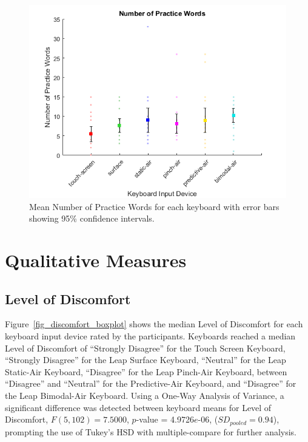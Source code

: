 \begin{figure}[h]
	\centering
	\includegraphics{fig_num_practice_mean}
	\caption[Mean Number of Practice Words]{Mean Number of Practice Words for each keyboard with error bars showing 95\% confidence intervals.}
	\label{fig_num_practice_mean}
\end{figure}

\section{Qualitative Measures}

\subsection{Level of Discomfort}
Figure~\ref{fig_discomfort_boxplot} shows the median Level of Discomfort for each keyboard input device rated by the participants. Keyboards reached a median Level of Discomfort of ``Strongly Disagree'' for the Touch Screen Keyboard, ``Strongly Disagree'' for the Leap Surface Keyboard, ``Neutral'' for the Leap Static-Air Keyboard, ``Disagree'' for the Leap Pinch-Air Keyboard, between ``Disagree'' and ``Neutral'' for the Predictive-Air Keyboard, and ``Disagree'' for the Leap Bimodal-Air Keyboard. Using a One-Way Analysis of Variance, a significant difference was detected between keyboard means for Level of Discomfort, $F(5, 102) = 7.5000$, $p$-value = 4.9726$e$-06, ($SD_{pooled} = 0.94$), prompting the use of Tukey's HSD with multiple-compare for further analysis.

